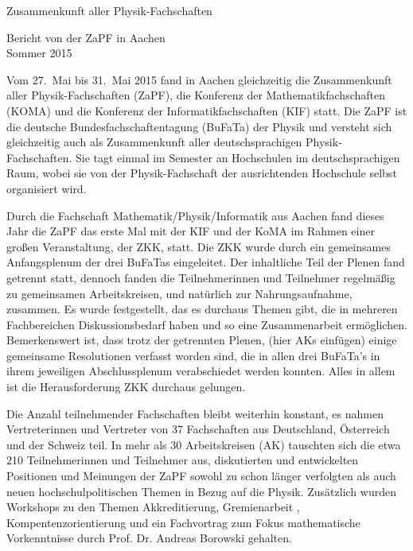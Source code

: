 \documentclass{scrartcl}
\begin{document}
\hspace{0.74\textwidth}
\begin{minipage}{0.25\textwidth}
	  \vspace{-1cm}
	  \centering
	  \small Zusammenkunft aller Physik-Fachschaften
\end{minipage}

\begin{center}
	  \vspace{1.5cm}
	  \huge{Bericht von der ZaPF in Aachen \\ Sommer 2015}
	  \vspace{1cm}
\end{center}

Vom  27.\ Mai bis 31.\ Mai 2015 fand in Aachen gleichzeitig die Zusammenkunft
aller Physik-Fachschaften (ZaPF), die Konferenz der Mathematikfachschaften
(KOMA) und die Konferenz der Informatikfachschaften (KIF) statt. Die ZaPF ist
die deutsche  Bundesfachschaftentagung (BuFaTa) der Physik und versteht sich
gleichzeitig auch  als Zusammenkunft aller deutschsprachigen
Physik-Fachschaften. Sie tagt einmal im Semester an Hochschulen im
deutschsprachigen Raum, wobei sie  von der  Physik-Fachschaft der ausrichtenden
Hochschule selbst organisiert wird.

Durch die Fachschaft Mathematik/Physik/Informatik aus Aachen fand dieses Jahr
die ZaPF das erste Mal mit der KIF und der KoMA im Rahmen einer großen
Veranstaltung, der ZKK, statt. Die ZKK wurde durch ein gemeinsames
Anfangsplenum der drei BuFaTas eingeleitet. Der inhaltliche Teil der Plenen
fand getrennt statt, dennoch fanden die Teilnehmerinnen und Teilnehmer
regelmäßig zu gemeinsamen Arbeitskreisen, und natürlich zur Nahrungsaufnahme,
zusammen. Es wurde festgestellt, das es durchaus Themen gibt, die in mehreren
Fachbereichen Diskussionsbedarf haben und so eine Zusammenarbeit ermöglichen.
Bemerkenswert ist, dass trotz der getrennten Plenen, (hier AKs einfügen) einige
gemeinsame Resolutionen verfasst worden sind, die in allen drei BuFaTa's in
ihrem jeweiligen Abschlussplenum verabschiedet werden konnten. Alles in allem
ist die Herausforderung ZKK durchaus gelungen.

Die Anzahl teilnehmender Fachschaften bleibt weiterhin konstant, es nahmen Vertreterinnen und Vertreter von 37 Fachschaften aus Deutschland, Österreich und der Schweiz teil.  In mehr als 30 Arbeitskreisen (AK) tauschten sich die etwa 210 Teilnehmerinnen und Teilnehmer aus, diskutierten und entwickelten  Positionen und Meinungen der ZaPF sowohl zu schon länger verfolgten  als auch neuen hochschulpolitischen Themen in Bezug auf die Physik.  Zusätzlich wurden Workshops zu den Themen Akkreditierung, Gremienarbeit , Kompentenzorientierung und ein Fachvortrag zum Fokus mathematische Vorkenntnisse  durch Prof. Dr.  Andreas Borowski  gehalten.
\end{document}
